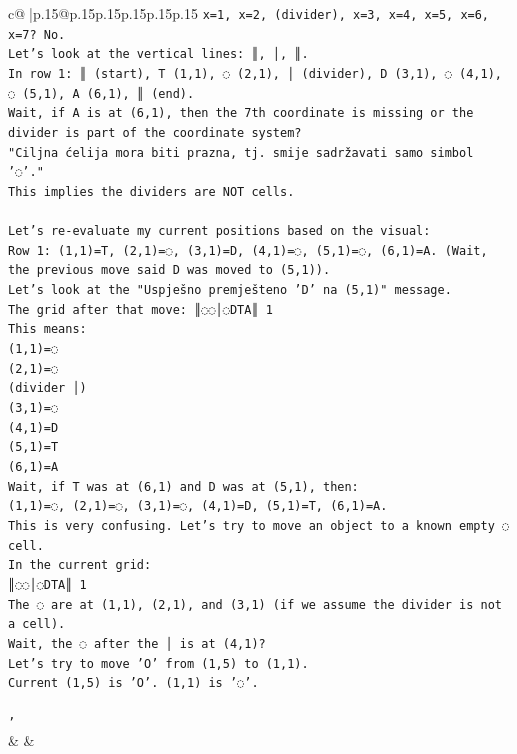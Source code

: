 \documentclass{article}
\begin{document}
{\begin{supertabular}{c@{$\;$}|p{.15\linewidth}@{}p{.15\linewidth}p{.15\linewidth}p{.15\linewidth}p{.15\linewidth}p{.15\linewidth}}
{{{\texttt{x=1, x=2, (divider), x=3, x=4, x=5, x=6, x=7? No.} \\
\texttt{Let's look at the vertical lines: ║, │, ║.} \\
\texttt{In row 1: ║ (start), T (1,1), ◌ (2,1), │ (divider), D (3,1), ◌ (4,1), ◌ (5,1), A (6,1), ║ (end).} \\
\texttt{Wait, if A is at (6,1), then the 7th coordinate is missing or the divider is part of the coordinate system?} \\
\texttt{"Ciljna ćelija mora biti prazna, tj. smije sadržavati samo simbol '◌'."} \\
\texttt{This implies the dividers are NOT cells.} \\
\\ 
\texttt{Let's re{-}evaluate my current positions based on the visual:} \\
\texttt{Row 1: (1,1)=T, (2,1)=◌, (3,1)=D, (4,1)=◌, (5,1)=◌, (6,1)=A. (Wait, the previous move said D was moved to (5,1)).} \\
\texttt{Let's look at the "Uspješno premješteno 'D' na (5,1)" message.} \\
\texttt{The grid after that move: ║◌◌│◌DTA║ 1} \\
\texttt{This means:} \\
\texttt{(1,1)=◌} \\
\texttt{(2,1)=◌} \\
\texttt{(divider │)} \\
\texttt{(3,1)=◌} \\
\texttt{(4,1)=D} \\
\texttt{(5,1)=T} \\
\texttt{(6,1)=A} \\
\texttt{Wait, if T was at (6,1) and D was at (5,1), then:} \\
\texttt{(1,1)=◌, (2,1)=◌, (3,1)=◌, (4,1)=D, (5,1)=T, (6,1)=A.} \\
\texttt{This is very confusing. Let's try to move an object to a known empty ◌ cell.} \\
\texttt{In the current grid:} \\
\texttt{║◌◌│◌DTA║ 1} \\
\texttt{The ◌ are at (1,1), (2,1), and (3,1) (if we assume the divider is not a cell).} \\
\texttt{Wait, the ◌ after the │ is at (4,1)?} \\
\texttt{Let's try to move 'O' from (1,5) to (1,1).} \\
\texttt{Current (1,5) is 'O'. (1,1) is '◌'.} \\
\\ 
\texttt{'} \\
            }
        }
    }
    & & \\ \\


\end{supertabular}}
\end{document}
